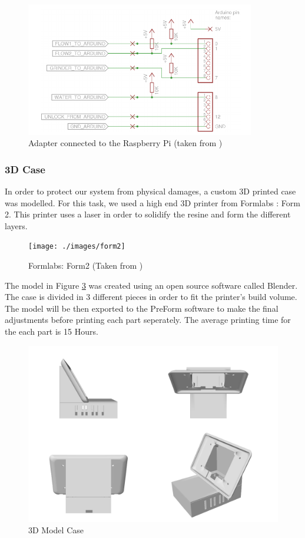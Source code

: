 \documentclass[12pt]{article}
\begin{document}
  \begin{figure}[H]
   \centering
   \includegraphics[width=10cm]{./images/adapterraspberry.pdf}
   \captionsetup{justification=centering}
   \caption{Adapter connected to the Raspberry Pi (taken from \cite{BachelorThesis})}
   \label{fig:adapterraspberry}
  \end{figure}
  \subsubsection{3D Case}
  
  In order to protect our system from physical damages, a custom 3D printed case was modelled. For this task, we used a high end 3D printer from Formlabs : Form 2.
  This printer uses a laser in order to solidify the resine and form the different layers.
   \begin{figure}[H]
   \centering
   \texttt{[image: ./images/form2]}
   \captionsetup{justification=centering}
   \caption{Formlabs: Form2 (Taken from \cite{formlabs})}
   \label{fig:form2}
  \end{figure}
  The model in Figure \ref{fig:model} was created using an open source software called Blender. The case is divided in 3 different pieces in order to fit the printer's build volume.
  The model will be then exported to the PreForm software to make the final adjustments before printing each part seperately. The average printing time for the each part is 15 Hours.
  
  \begin{figure}[H]
   \centering
   \includegraphics[width=1.0\textwidth]{./images/case}
   \captionsetup{justification=centering}
   \caption{3D Model Case}
   \label{fig:model}
  \end{figure}
\end{document}
